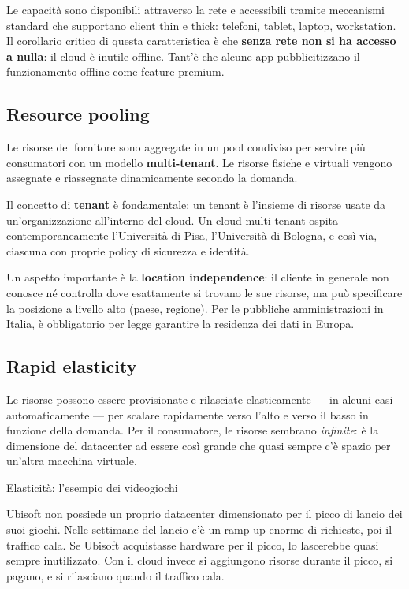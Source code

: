 \documentclass[
  italian,
  openany]{book}
\begin{document}
Le capacità sono disponibili attraverso la rete e accessibili tramite
meccanismi standard che supportano client thin e thick: telefoni,
tablet, laptop, workstation. Il corollario critico di questa
caratteristica è che \textbf{senza rete non si ha accesso a nulla}: il
cloud è inutile offline. Tant'è che alcune app pubblicitizzano il
funzionamento offline come feature premium.

\subsection{Resource pooling}\label{resource-pooling}

Le risorse del fornitore sono aggregate in un pool condiviso per servire
più consumatori con un modello \textbf{multi-tenant}. Le risorse fisiche
e virtuali vengono assegnate e riassegnate dinamicamente secondo la
domanda.

Il concetto di \textbf{tenant} è fondamentale: un tenant è l'insieme di
risorse usate da un'organizzazione all'interno del cloud. Un cloud
multi-tenant ospita contemporaneamente l'Università di Pisa,
l'Università di Bologna, e così via, ciascuna con proprie policy di
sicurezza e identità.

Un aspetto importante è la \textbf{location independence}: il cliente in
generale non conosce né controlla dove esattamente si trovano le sue
risorse, ma può specificare la posizione a livello alto (paese,
regione). Per le pubbliche amministrazioni in Italia, è obbligatorio per
legge garantire la residenza dei dati in Europa.

\subsection{Rapid elasticity}\label{rapid-elasticity}

Le risorse possono essere provisionate e rilasciate elasticamente --- in
alcuni casi automaticamente --- per scalare rapidamente verso l'alto e
verso il basso in funzione della domanda. Per il consumatore, le risorse
sembrano \emph{infinite}: è la dimensione del datacenter ad essere così
grande che quasi sempre c'è spazio per un'altra macchina virtuale.

\begin{callouttip}{Elasticità: l’esempio dei videogiochi}

Ubisoft non possiede un proprio datacenter dimensionato per il picco di
lancio dei suoi giochi. Nelle settimane del lancio c'è un ramp-up enorme
di richieste, poi il traffico cala. Se Ubisoft acquistasse hardware per
il picco, lo lascerebbe quasi sempre inutilizzato. Con il cloud invece
si aggiungono risorse durante il picco, si pagano, e si rilasciano
quando il traffico cala.

\end{callouttip}
\end{document}
